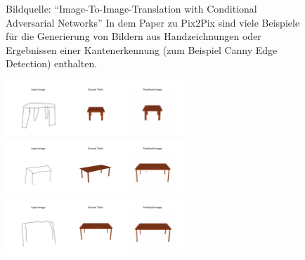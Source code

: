 \begin{figure}[h]
	\centering
	\hspace{.5cm}
	\hspace{.5cm}
	\caption[Bildarithmetik]{Bildquelle: ``Image-To-Image-Translation with Conditional Adversarial Networks'' \cite{isola2018imagetoimage} \newline In dem Paper zu Pix2Pix sind viele Beispiele für die Generierung von Bildern aus Handzeichnungen oder Ergebnissen einer Kantenerkennung (zum Beispiel Canny Edge Detection) enthalten.}
	\label{fig:pix2pixexamples_2}
\end{figure}

\begin{figure}[h]
	\centering
	\includegraphics[width=0.6\textwidth]{bilder/table1small.png}
	\includegraphics[width=0.6\textwidth]{bilder/table2small.png}
	\includegraphics[width=0.6\textwidth]{bilder/table3small.png}


\end{figure}
